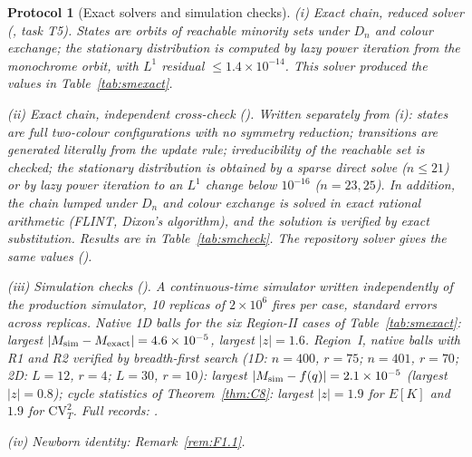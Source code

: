 \documentclass[pdflatex,sn-mathphys-num]{sn-jnl}
\newcommand{\SimTwoMaxAbsZ}{1.6}
\newcommand{\SimTwoMaxAbsDiff}{4.6\times10^{-5}}
\newcommand{\SimOneMaxAbsZ}{0.8}
\newcommand{\SimOneMaxAbsDiff}{2.1\times10^{-5}}
\newcommand{\SimEKMaxAbsZ}{1.9}
\newcommand{\SimCVMaxAbsZ}{1.9}
\newcommand{\SimReplicas}{10}
\newcommand{\SimEvents}{2\times10^{6}}
\theoremstyle{thmstyleone}%
\theoremstyle{thmstylethree}%
\newtheorem{protocol}[theorem]{Protocol}
\theoremstyle{thmstyletwo}%
\begin{document}
\begin{protocol}[Exact solvers and simulation checks]
\label{prot:F3}
\emph{(i) Exact chain, reduced solver}
(, task T5). States are orbits of
reachable minority sets under $D_n$ and colour exchange; the stationary
distribution is computed by lazy power iteration from the monochrome
orbit, with $L^1$ residual $\le1.4\times10^{-14}$. This solver produced
the values in Table~\ref{tab:smexact}.

\emph{(ii) Exact chain, independent cross-check}
(). Written
separately from (i): states are full two-colour configurations with no
symmetry reduction; transitions are generated literally from the update
rule; irreducibility of the reachable set is checked; the stationary
distribution is obtained by a sparse direct solve ($n\le21$) or by lazy
power iteration to an $L^1$ change below $10^{-16}$ ($n=23,25$). In addition, the chain
lumped under $D_n$ and colour exchange is solved in exact rational
arithmetic (FLINT, Dixon's algorithm), and the solution is verified by
exact substitution. Results are in Table~\ref{tab:smcheck}. The repository
solver  gives the same values
().

\emph{(iii) Simulation checks}
(). A continuous-time
simulator written independently of the production simulator,
\SimReplicas{} replicas of $\SimEvents$ fires per case, standard errors
across replicas. Native 1D balls for the six Region-II cases of
Table~\ref{tab:smexact}: largest $|M_{\rm sim}-M_{\rm exact}|=\SimTwoMaxAbsDiff$,
largest $|z|=\SimTwoMaxAbsZ$. Region~I, native balls with R1 and R2
verified by breadth-first search (1D: $n=400$, $r=75$; $n=401$, $r=70$;
2D: $L=12$, $r=4$; $L=30$, $r=10$): largest $|M_{\rm sim}-f(q)|
=\SimOneMaxAbsDiff$ (largest $|z|=\SimOneMaxAbsZ$); cycle statistics of
Theorem~\ref{thm:C8}: largest $|z|=\SimEKMaxAbsZ$ for $E[K]$ and
$\SimCVMaxAbsZ$ for $\mathrm{CV}_T^2$. Full records:
.

\emph{(iv) Newborn identity:} Remark~\ref{rem:F1.1}.
\end{protocol}
\end{document}
